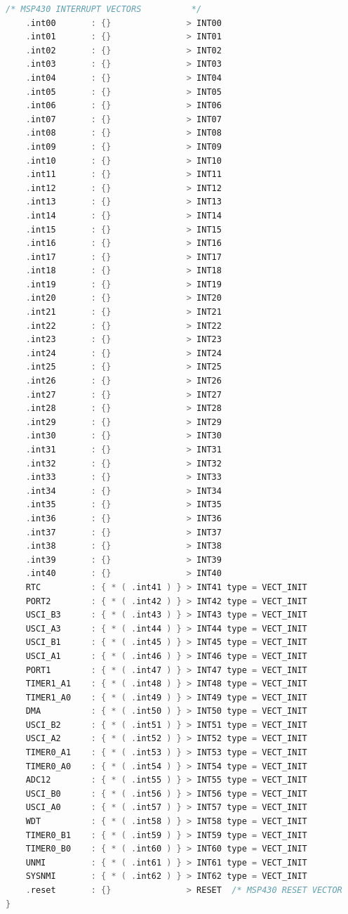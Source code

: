 \documentclass[LaM,binding=0.6cm]{../sapthesis}
\begin{document}
\begin{lstlisting}[language=C]
    /* MSP430 INTERRUPT VECTORS          */
    .int00       : {}               > INT00
    .int01       : {}               > INT01
    .int02       : {}               > INT02
    .int03       : {}               > INT03
    .int04       : {}               > INT04
    .int05       : {}               > INT05
    .int06       : {}               > INT06
    .int07       : {}               > INT07
    .int08       : {}               > INT08
    .int09       : {}               > INT09
    .int10       : {}               > INT10
    .int11       : {}               > INT11
    .int12       : {}               > INT12
    .int13       : {}               > INT13
    .int14       : {}               > INT14
    .int15       : {}               > INT15
    .int16       : {}               > INT16
    .int17       : {}               > INT17
    .int18       : {}               > INT18
    .int19       : {}               > INT19
    .int20       : {}               > INT20
    .int21       : {}               > INT21
    .int22       : {}               > INT22
    .int23       : {}               > INT23
    .int24       : {}               > INT24
    .int25       : {}               > INT25
    .int26       : {}               > INT26
    .int27       : {}               > INT27
    .int28       : {}               > INT28
    .int29       : {}               > INT29
    .int30       : {}               > INT30
    .int31       : {}               > INT31
    .int32       : {}               > INT32
    .int33       : {}               > INT33
    .int34       : {}               > INT34
    .int35       : {}               > INT35
    .int36       : {}               > INT36
    .int37       : {}               > INT37
    .int38       : {}               > INT38
    .int39       : {}               > INT39
    .int40       : {}               > INT40
    RTC          : { * ( .int41 ) } > INT41 type = VECT_INIT
    PORT2        : { * ( .int42 ) } > INT42 type = VECT_INIT
    USCI_B3      : { * ( .int43 ) } > INT43 type = VECT_INIT
    USCI_A3      : { * ( .int44 ) } > INT44 type = VECT_INIT
    USCI_B1      : { * ( .int45 ) } > INT45 type = VECT_INIT
    USCI_A1      : { * ( .int46 ) } > INT46 type = VECT_INIT
    PORT1        : { * ( .int47 ) } > INT47 type = VECT_INIT
    TIMER1_A1    : { * ( .int48 ) } > INT48 type = VECT_INIT
    TIMER1_A0    : { * ( .int49 ) } > INT49 type = VECT_INIT
    DMA          : { * ( .int50 ) } > INT50 type = VECT_INIT
    USCI_B2      : { * ( .int51 ) } > INT51 type = VECT_INIT
    USCI_A2      : { * ( .int52 ) } > INT52 type = VECT_INIT
    TIMER0_A1    : { * ( .int53 ) } > INT53 type = VECT_INIT
    TIMER0_A0    : { * ( .int54 ) } > INT54 type = VECT_INIT
    ADC12        : { * ( .int55 ) } > INT55 type = VECT_INIT
    USCI_B0      : { * ( .int56 ) } > INT56 type = VECT_INIT
    USCI_A0      : { * ( .int57 ) } > INT57 type = VECT_INIT
    WDT          : { * ( .int58 ) } > INT58 type = VECT_INIT
    TIMER0_B1    : { * ( .int59 ) } > INT59 type = VECT_INIT
    TIMER0_B0    : { * ( .int60 ) } > INT60 type = VECT_INIT
    UNMI         : { * ( .int61 ) } > INT61 type = VECT_INIT
    SYSNMI       : { * ( .int62 ) } > INT62 type = VECT_INIT
    .reset       : {}               > RESET  /* MSP430 RESET VECTOR         */ 
}


\end{lstlisting}
\end{document}
